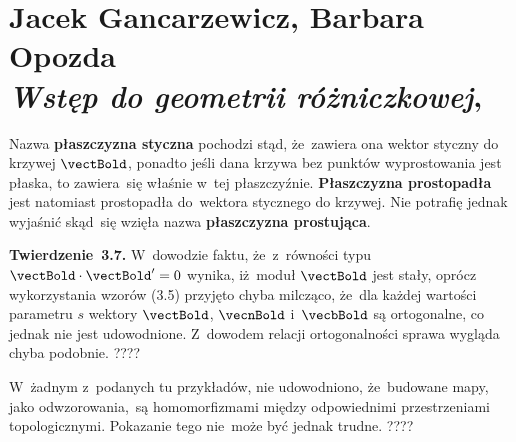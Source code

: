 \documentclass[a4paper,11pt]{article}
\numberwithin{equation}{section}
\begin{document}
\VerSpaceTwo













\newpage

\section{ %
  Jacek Gancarzewicz, Barbara Opozda \\
  \textit{Wstęp do geometrii różniczkowej},
  \cite{GancarzewiczOpozdaWstepDoGeometriiRozniczkowej2003}}

\vspace{0em}



\vspace{0em}


\noindent
{} Nazwa \textbf{płaszczyzna styczna} pochodzi stąd,
że~zawiera ona wektor styczny do krzywej $\vectBold$, ponadto jeśli dana
krzywa bez punktów wyprostowania jest płaska, to zawiera~się właśnie
w~tej płaszczyźnie. \textbf{Płaszczyzna prostopadła} jest natomiast
prostopadła do~wektora stycznego do krzywej. Nie potrafię jednak
wyjaśnić skąd~się wzięła nazwa \textbf{płaszczyzna prostująca}.

\VerSpaceFour





\noindent
{} \textbf{Twierdzenie~3.7.} W~dowodzie faktu, że~z~równości
typu $\vectBold \cdot \vectBold' = 0$ wynika, iż~moduł $\vectBold$ jest stały,
oprócz wykorzystania wzorów (3.5) przyjęto chyba milcząco, że~dla każdej
wartości parametru $s$ wektory $\vectBold$, $\vecnBold$ i~$\vecbBold$ są
ortogonalne, co jednak nie jest udowodnione. Z~dowodem relacji
ortogonalności sprawa wygląda chyba podobnie. ????

\VerSpaceFour





\noindent
{} W~żadnym z~podanych tu przykładów, nie udowodniono,
że~budowane mapy, jako odwzorowania,~są homomorfizmami między
odpowiednimi przestrzeniami topologicznymi. Pokazanie tego nie~może
być jednak trudne. ????

\VerSpaceFour
\end{document}
